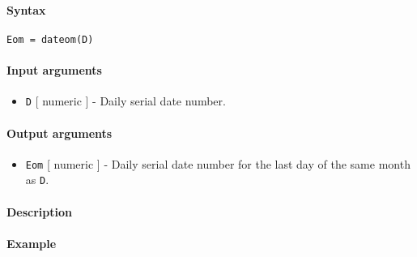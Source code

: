 


	\paragraph{Syntax}

\begin{verbatim}
Eom = dateom(D)
\end{verbatim}

\paragraph{Input arguments}

\begin{itemize}
\itemsep1pt\parskip0pt
\item
  \texttt{D} {[} numeric {]} - Daily serial date number.
\end{itemize}

\paragraph{Output arguments}

\begin{itemize}
\itemsep1pt\parskip0pt
\item
  \texttt{Eom} {[} numeric {]} - Daily serial date number for the last
  day of the same month as \texttt{D}.
\end{itemize}

\paragraph{Description}

\paragraph{Example}



